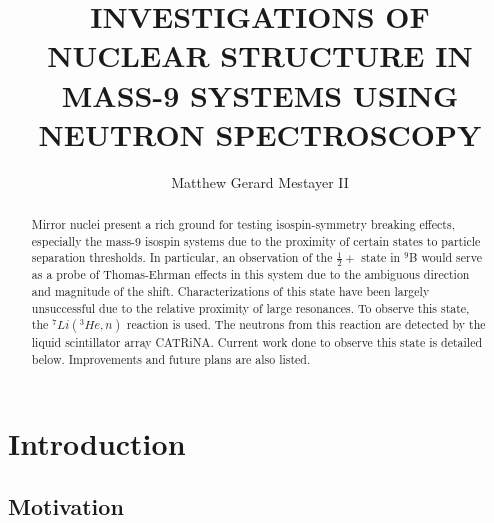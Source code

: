 \documentclass[11pt,copyright]{fsuthesis}
\title{INVESTIGATIONS OF NUCLEAR STRUCTURE IN MASS-9 SYSTEMS USING NEUTRON SPECTROSCOPY}
\author{Matthew Gerard Mestayer II}
\begin{document}
\frontmatter
\maketitle
\makecommitteepage

\tableofcontents

\begin{abstract}
Mirror nuclei present a rich ground for testing isospin-symmetry breaking effects, especially the mass-9 isospin systems due to the proximity of certain states to particle separation thresholds. In particular, an observation of the $\frac{1}{2}+$ state in $^9$B would serve as a probe of Thomas-Ehrman effects in this system due to the ambiguous direction and magnitude of the shift. Characterizations of this state have been largely unsuccessful due to the relative proximity of large resonances. To observe this state, the $^7Li(^3He,n)$ reaction is used. The neutrons from this reaction are detected by the liquid scintillator array CATRiNA. Current work done to observe this state is detailed below. Improvements and future plans are also listed. 
\end{abstract}

\mainmatter

\chapter{Introduction}

\section{Motivation}
\end{document}
